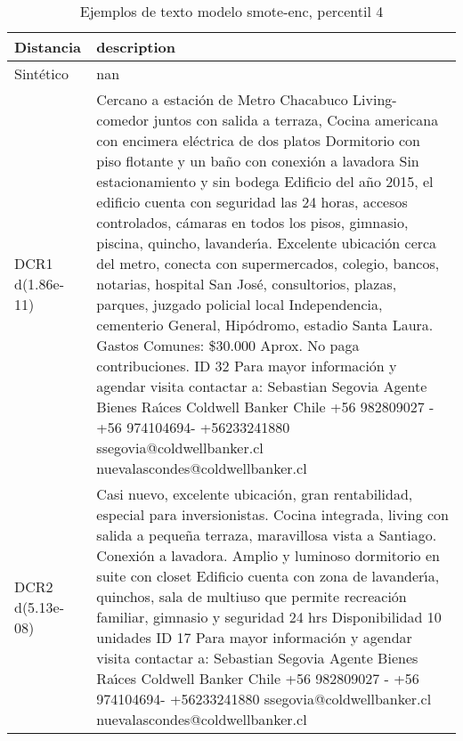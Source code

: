 \begin{table}[H]
\centering
\fontsize{10}{14}\selectfont
\caption{Ejemplos de texto modelo smote-enc, percentil 4}
\label{table-example-economicos-a-2-smote-enc-4p-text}
\begin{tabular}{|l|m{35em}|}
\hline
\rowcolor[gray]{0.8}
Distancia & description \\
\hline Sintético & nan \\
\hline DCR1 d(1.86e-11) & Cercano a estaci\'on de Metro Chacabuco
Living-comedor juntos con salida a terraza, Cocina americana con encimera el\'ectrica de dos platos  
Dormitorio con piso flotante y un ba\~no con conexi\'on a lavadora 
Sin estacionamiento y sin bodega
Edificio del a\~no 2015, el edificio cuenta con seguridad las 24 horas, accesos controlados, c\'amaras en todos los pisos, gimnasio, piscina, quincho, lavander{\'\i}a. 
Excelente ubicaci\'on cerca del metro, conecta con supermercados, colegio, bancos, notarias, hospital San Jos\'e, consultorios, plazas, parques, juzgado policial local Independencia, cementerio General, Hip\'odromo, estadio Santa Laura.
Gastos Comunes: \$30.000 Aprox.
No paga contribuciones.
ID 32
Para mayor informaci\'on y agendar visita contactar a:
Sebastian Segovia
Agente Bienes Ra{\'\i}ces
Coldwell Banker Chile
+56 982809027 - +56 974104694- +56233241880 
ssegovia@coldwellbanker.cl
nuevalascondes@coldwellbanker.cl \\
\hline DCR2 d(5.13e-08) & Casi nuevo, excelente ubicaci\'on, gran rentabilidad, especial para inversionistas.
Cocina integrada, living con salida a peque\~na terraza, maravillosa vista a Santiago.
Conexi\'on a lavadora.
Amplio y luminoso dormitorio en suite con closet
Edificio cuenta con zona de lavander{\'\i}a, quinchos, sala de multiuso que permite recreaci\'on familiar, gimnasio y seguridad 24 hrs
Disponibilidad 10 unidades
ID 17
Para mayor informaci\'on y agendar visita contactar a:
Sebastian Segovia
Agente Bienes Ra{\'\i}ces
Coldwell Banker Chile
+56 982809027 - +56 974104694- +56233241880 
ssegovia@coldwellbanker.cl
nuevalascondes@coldwellbanker.cl \\
\hline
\end{tabular}
\end{table}
